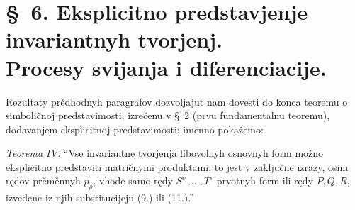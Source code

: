 \documentclass[11pt]{article}
\begin{document}
\section*{\S\ 6. Eksplicitno predstavjenje invariantnyh tvorjenj.\\Procesy svijanja i diferenciacije.}

Rezultaty prědhodnyh paragrafov dozvoljajut nam dovesti do konca teoremu o simboličnoj predstavimosti, izrečenu v \S\ 2 (prvu fundamentalnu teoremu), dodavanjem eksplicitnoj predstavimosti; imenno pokažemo:

\emph{Teorema IV:} ``Vse invariantne tvorjenja libovolnyh osnovnyh form možno eksplicitno predstaviti matričnymi produktami; to jest v zaključne izrazy, osim rędov prěměnnyh $p_\rho$, vhode samo rędy $S^\sigma,\ldots,T^\tau$ prvotnyh form ili rędy $P,Q,R$, izvedene iz njih substitucijeju (9.) ili (11.).''
\end{document}
